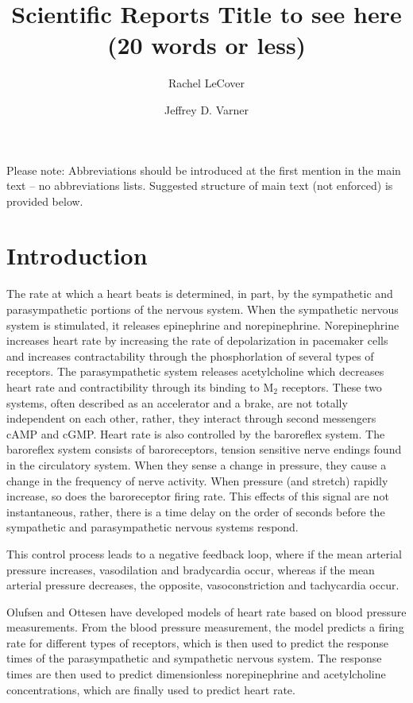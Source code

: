 \documentclass[fleqn,10pt]{wlscirep}
\title{Scientific Reports Title to see here (20 words or less)}
\author[1]{Rachel LeCover}
\author[1,*]{Jeffrey D. Varner}
\affil[1]{Affiliation, School of Chemical and Biomolecular Engineering, Ithaca NY, 14852, USA}
\affil[*]{jdv27@cornell.edu}
\begin{document}
\flushbottom
\maketitle
%
%
\thispagestyle{empty}
\noindent Please note: Abbreviations should be introduced at the first mention in the main text – no abbreviations lists. Suggested structure of main text (not enforced) is provided below.
\section*{Introduction}
The rate at which a heart beats is determined, in part, by the sympathetic and parasympathetic portions of the nervous system. When the sympathetic nervous system is stimulated, it releases epinephrine and norepinephrine. Norepinephrine increases heart rate by increasing the rate of depolarization in pacemaker cells and increases contractability through the phosphorlation of several types of receptors.\cite{boron2016medical} The parasympathetic system releases acetylcholine which decreases heart rate and contractibility through its binding to M$_2$ receptors.  These two systems, often described as an accelerator and a brake, are not totally independent on each other, rather, they interact through second messengers cAMP and cGMP. \cite{olshansky2008parasympathetic}
Heart rate is also controlled by the baroreflex system. The baroreflex system consists of baroreceptors, tension sensitive nerve endings found in the circulatory system. \cite{ottesen1997modelling} When they sense a change in pressure, they cause a change in the frequency of nerve activity. When pressure (and stretch) rapidly increase, so does the baroreceptor firing rate. \cite{negative1999reflexes} This effects of this signal are not instantaneous, rather, there is a time delay on the order of seconds before the sympathetic and parasympathetic nervous systems respond. \cite{ottesen1997modelling}

This control process leads to a negative feedback loop, where if the mean arterial pressure increases, vasodilation and bradycardia occur, whereas if the mean arterial pressure decreases, the opposite, vasoconstriction and tachycardia occur. \cite{boron2016medical}

Olufsen and Ottesen have developed models of heart rate based on blood pressure measurements.\cite{olufsen2013practical} From the blood pressure measurement, the model predicts a firing rate for different types of receptors, which is then used to predict the response times of the parasympathetic and sympathetic nervous system. The response times are then used to predict dimensionless norepinephrine and acetylcholine concentrations, which are finally used to predict heart rate. 
\end{document}
